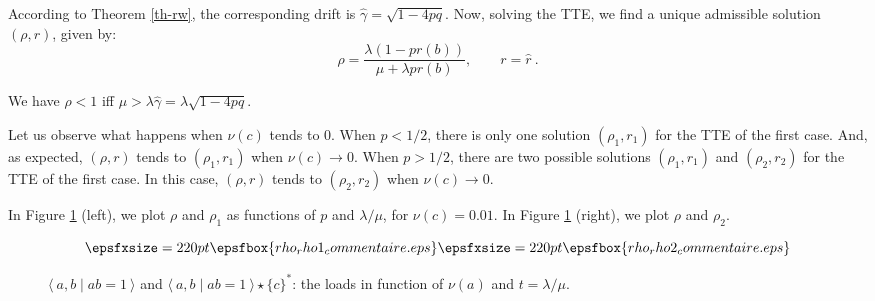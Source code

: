 \documentclass[11pt,a4paper]{article}
\theoremstyle{remark}
\newcommand{\pres}[2]{\langle \: #1 \mid #2 \: \rangle}
\begin{document}
According to Theorem \ref{th-rw}, the corresponding drift is
$\widehat{\gamma}=\displaystyle\sqrt{1-4pq}$.
Now, solving the TTE,
we find a unique admissible
solution $(\rho,r)$, given by:
$$\rho=\frac{\lambda(1-p r(b))}{\mu+\lambda p r(b)}, \qquad r =
\widehat{r} \:.
$$

We have $\rho<1$ iff
$\mu>\lambda\widehat{\gamma}=\lambda\displaystyle\sqrt{1-4pq}$.

Let us observe what happens when $\nu(c)$ tends to 0. When
$p<1/2$, there is only one solution $(\rho_1,r_1)$ for the TTE of
the first case. And, as expected, $(\rho,r)$ tends to
$(\rho_1,r_1)$ when $\nu(c)\rightarrow 0$. When $p> 1/2$, there
are two possible solutions $(\rho_1,r_1)$ and $(\rho_2,r_2)$ for
the TTE of the first case. In this  case, $(\rho,r)$ tends to
$(\rho_2,r_2)$ when $\nu(c)\rightarrow 0$.


In Figure \ref{ab=1_c_p=2/5} (left), we
plot $\rho$ and $\rho_1$ as functions of $p$ and $\lambda/\mu$,
for $\nu(c)=0.01$. In Figure \ref{ab=1_c_p=2/5} (right), we
plot $\rho$ and $\rho_2$.


\begin{figure}[ht]
\[ \epsfxsize=220pt \epsfbox{rho_rho1_commentaire.eps}
\epsfxsize=220pt \epsfbox{rho_rho2_commentaire.eps} \] 
\caption{$\pres{a,b}{ab=1}$ and $\pres{a,b}{ab=1}\star \{c\}^*$: the
  loads in function of $\nu(a)$ and $t=\lambda/\mu$.}
\label{ab=1_c_p=2/5}
\end{figure}
\end{document}
